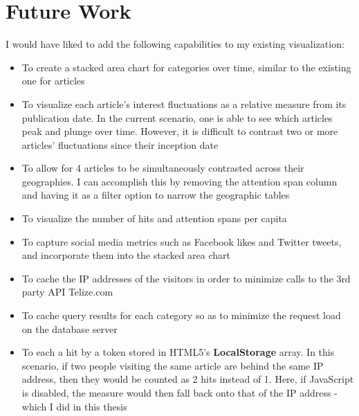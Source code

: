 \documentclass[12pt]{article}
\begin{document}
\newpage

\section{Future Work}
I would have liked to add the following capabilities to my existing visualization:
\begin{itemize}
\item To create a stacked area chart for categories over time, similar to the existing one for articles
\item To visualize each article's interest fluctuations as a relative measure from its publication date. In the current scenario, one is able to see which articles peak and plunge over time. However, it is difficult to contrast two or more articles' fluctuations since their inception date
\item To allow for 4 articles to be simultaneously contrasted across their geographies. I can accomplish this by removing the attention span column and having it as a filter option to narrow the geographic tables
\item To visualize the number of hits and attention spans per capita
\item To capture social media metrics such as Facebook likes and  Twitter tweets, and incorporate them into the stacked area chart 
\item To cache the IP addresses of the visitors in order to minimize calls to the 3rd party API Telize.com
\item To cache query results for each category so as to minimize the request load on the database server
\item To each a hit by a token stored in HTML5's \textbf{LocalStorage} array. In this scenario, if two people visiting the same article are behind the same IP address, then they would be counted as 2 hits instead of 1. Here, if JavaScript is disabled, the measure would then fall back onto that of the IP address - which I did in this thesis 
\end{itemize}
\newpage
\end{document}

